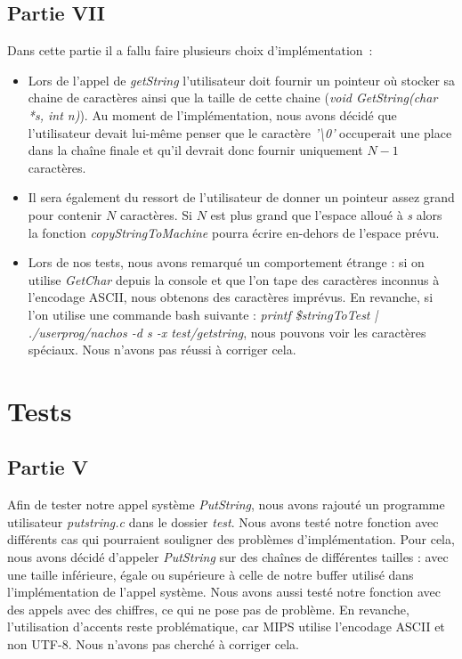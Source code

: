 \documentclass{article}
\begin{document}
    \subsection{Partie VII}
    Dans cette partie il a fallu faire plusieurs choix d'implémentation :
    \begin{itemize}
        \item Lors de l'appel de \textit{getString} l'utilisateur doit fournir un pointeur où
            stocker sa chaine de caractères ainsi que la taille de cette chaine \linebreak
            (\textit{void GetString(char *s, int n)}). Au moment de l'implémentation, nous
            avons décidé que l'utilisateur devait lui-même penser que le caractère
            \textit{'\textbackslash0'} occuperait une place dans la chaîne finale et qu'il
            devrait donc fournir uniquement $N-1$ caractères.
        \item Il sera également du ressort de l'utilisateur de donner un pointeur assez grand
            pour contenir $N$ caractères. Si $N$ est plus grand que l'espace alloué à
            \textit{s} alors la fonction \textit{copyStringToMachine} pourra écrire
            en-dehors de l'espace prévu.
        \item Lors de nos tests, nous avons remarqué un comportement étrange : si on utilise
            \textit{GetChar} depuis la console et que l'on tape des caractères inconnus à l'encodage
            ASCII, nous obtenons des caractères imprévus. En revanche, si l'on utilise une commande bash suivante :
            \textit{printf \$stringToTest | ./userprog/nachos -d s -x test/getstring}, nous pouvons voir les caractères spéciaux.
            Nous n'avons pas réussi à corriger cela.

    \end{itemize}

\section{Tests}

    \subsection{Partie V}
    Afin de tester notre appel système \textit{PutString}, nous avons rajouté un
    programme utilisateur \textit{putstring.c }dans le dossier \textit{test}. Nous
    avons testé notre fonction avec différents cas qui pourraient souligner des
    problèmes d'implémentation. Pour cela, nous avons décidé d'appeler
    \textit{PutString} sur des chaînes de différentes tailles : avec une taille
    inférieure, égale ou supérieure à celle de notre buffer utilisé dans
    l'implémentation de l'appel système. Nous avons aussi testé notre fonction avec
    des appels avec des chiffres, ce qui ne pose pas de problème. En revanche,
    l'utilisation d'accents reste problématique, car MIPS utilise l'encodage ASCII
    et non UTF-8. Nous n'avons pas cherché à corriger cela.
\end{document}
